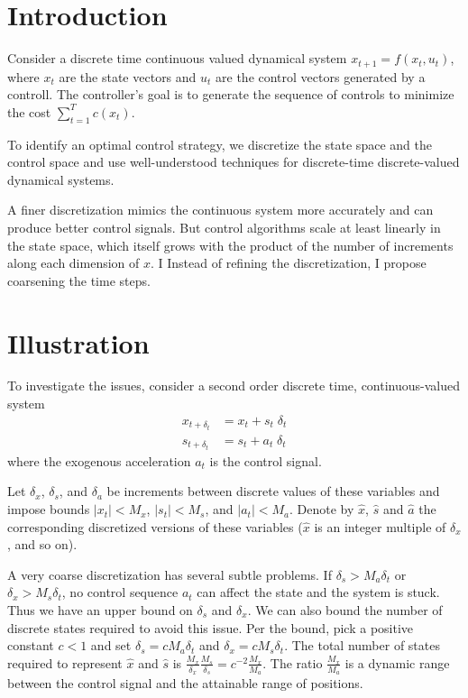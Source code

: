 \documentclass{article}
\begin{document}
\section{Introduction}

Consider a discrete time continuous valued dynamical system $x_{t+1} =
f(x_t,u_t)$, where $x_t$ are the state vectors and $u_t$ are the
control vectors generated by a controll. The controller's goal is to
generate the sequence of controls to minimize the cost $\sum_{t=1}^T
c(x_t)$.

To identify an optimal control strategy, we discretize the state space
and the control space and use well-understood techniques for
discrete-time discrete-valued dynamical systems.

A finer discretization mimics the continuous system more accurately
and can produce better control signals.  But control algorithms scale
at least linearly in the state space, which itself grows with the
product of the number of increments along each dimension of $x$.  I
Instead of refining the discretization, I propose coarsening the time
steps.


\section{Illustration}

To investigate the issues, consider a second order discrete time,
continuous-valued system
\begin{eqnarray*}
  x_{t+\delta_t} &= x_t + s_t \;\delta_t \\
  s_{t+\delta_t} &= s_t + a_t \;\delta_t
\end{eqnarray*}
where the exogenous acceleration $a_t$ is the control signal.

Let $\delta_x$, $\delta_s$, and $\delta_a$ be increments between
discrete values of these variables and impose bounds $|x_t|<M_x$,
$|s_t|<M_s$, and $|a_t|<M_a$. Denote by $\hat{x}$, $\hat{s}$ and
$\hat{a}$ the corresponding discretized versions of these variables
($\hat{x}$ is an integer multiple of $\delta_x$, and so on).

A very coarse discretization has several subtle problems. If $\delta_s
> M_a\delta_t$ or $\delta_x > M_s\delta_t$, no control sequence $a_t$
can affect the state and the system is stuck. Thus we have an upper
bound on $\delta_s$ and $\delta_x$.  We can also bound the number of
discrete states required to avoid this issue. Per the bound, pick a
positive constant $c<1$ and set $\delta_s = cM_a\delta_t$ and
$\delta_x = c M_s\delta_t$. The total number of states required to
represent $\hat{x}$ and $\hat{s}$ is
$\frac{M_x}{\delta_x}\frac{M_s}{\delta_s} = c^{-2}
\frac{M_x}{M_a}$. The ratio $\frac{M_x}{M_a}$ is a dynamic range
between the control signal and the attainable range of positions.
\end{document}
